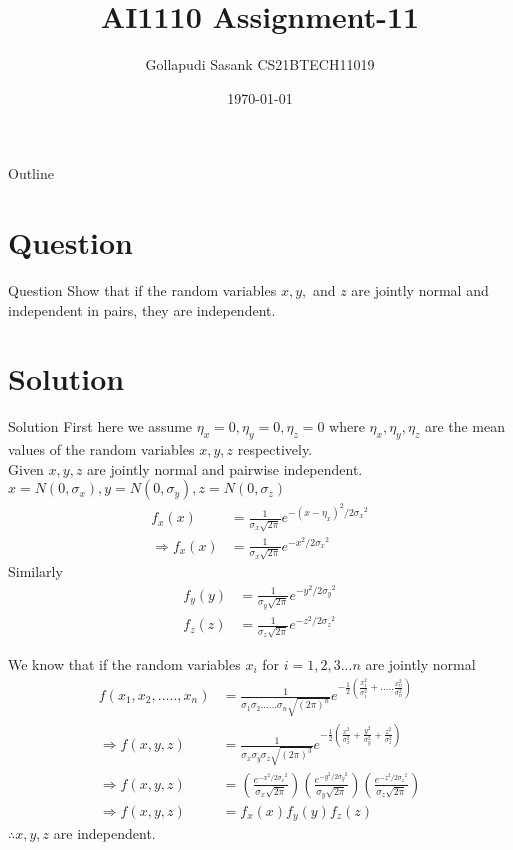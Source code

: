 \documentclass{beamer}
\title{AI1110 Assignment-11}
\author{Gollapudi Sasank CS21BTECH11019}
\date{\today}
\providecommand{\brak}[1]{\ensuremath{\left(#1\right)}}
\begin{document}
\begin{frame}
    \titlepage 
\end{frame}

\logo{}


\begin{frame}{Outline}
    \tableofcontents
\end{frame}


\section{Question}
\begin{frame}{Question}
Show that if the random variables $x,y,$ and $z$ are jointly normal and independent in pairs, they are independent.
\end{frame}

\section{Solution}
\begin{frame}{Solution}
First here we assume $\eta_x = 0 ,\eta_y = 0 ,\eta_z = 0 $ where $\eta_x,\eta_y,\eta_z$ are the mean values of the random variables $x,y,z$ respectively.\\
Given $x,y,z$ are jointly normal and pairwise independent.\\
$x = N(0,\sigma_x) , y = N(0,\sigma_y) , z = N(0,\sigma_z)$\\
\begin{align}
f_x(x) &= \frac{1}{\sigma_x\sqrt{2\pi}} e^{-{(x-\eta_x)}^{2}/2        {\sigma_x}^{2}} \\
\Rightarrow f_x(x) &= \frac{1}{\sigma_x\sqrt{2\pi}} e^{-x^{2}/2{\sigma_x}^{2}} 
\end{align}
Similarly 
\begin{align}
f_y(y) &= \frac{1}{\sigma_y\sqrt{2\pi}} e^{-y^{2}/2{\sigma_y}^{2}} \\
f_z(z) &= \frac{1}{\sigma_z\sqrt{2\pi}} e^{-z^{2}/2{\sigma_z}^{2}}
\end{align}
\end{frame}

\begin{frame}
We know that if the random variables $x_i$ for $i = 1,2,3...n$ are jointly normal 
\begin{align}
f(x_1,x_2,.....,x_n) &= \frac{1}{\sigma_1\sigma_2......\sigma_n \sqrt{{(2\pi)}^n}} e^{{-\frac{1}{2} \brak{\frac{x_1^2}{\sigma_1^2} +..... \frac{x_n^2}{\sigma_n^2} } }} \\
\Rightarrow f(x,y,z) &= \frac{1}{\sigma_x\sigma_y\sigma_z \sqrt{{(2\pi)}^3}} e^{-\frac{1}{2} \brak{ \frac{x^2}{\sigma_x^2} + \frac{y^2}{\sigma_y^2} + \frac{z^2}{\sigma_z^2} } } \\ 
\Rightarrow f(x,y,z) &= \brak{\frac{e^{-x^{2}/2{\sigma_x}^{2}}}{\sigma_x\sqrt{2\pi}}} \brak{\frac{e^{-y^{2}/2{\sigma_y}^{2}}}{\sigma_y\sqrt{2\pi}}} \brak{\frac{e^{-z^{2}/2{\sigma_z}^{2}}}{\sigma_z\sqrt{2\pi}}} \\
\Rightarrow f(x,y,z) &= f_x(x) f_y(y) f_z(z)
\end{align}
$\therefore x,y,z$ are independent.
\end{frame}
\end{document}
